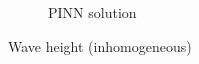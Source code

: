 \begin{frame}
\begin{figure}
\begin{subfigure}[b]{0.45\textwidth}
            \caption{PINN solution}
            \label{fig:15_inhomogeneous_pinn_swe_height}
        \end{subfigure}
        \caption{Wave height (inhomogeneous)}
        \label{fig:15_inhomogeneous_wave_height}
    \end{figure}
\end{frame}